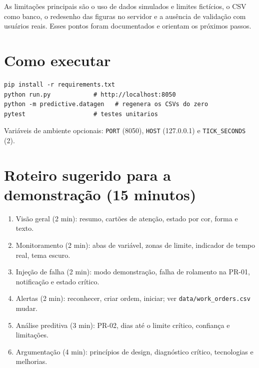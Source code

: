 \documentclass[12pt,a4paper]{article}
\newcommand{\codigo}[1]{\texttt{\small #1}}
\begin{document}
As limitações principais são o uso de dados simulados e limites fictícios, o CSV como banco, o redesenho das figuras no servidor e a ausência de validação com usuários reais.
Esses pontos foram documentados e orientam os próximos passos.

\appendix
\section{Como executar}
\begin{lstlisting}
pip install -r requirements.txt
python run.py            # http://localhost:8050
python -m predictive.datagen   # regenera os CSVs do zero
pytest                   # testes unitarios
\end{lstlisting}
Variáveis de ambiente opcionais: \codigo{PORT} (8050), \codigo{HOST} (127.0.0.1) e \codigo{TICK\_SECONDS} (2).

\section{Roteiro sugerido para a demonstração (15 minutos)}
\begin{enumerate}
  \item Visão geral (2 min): resumo, cartões de atenção, estado por cor, forma e texto.
  \item Monitoramento (2 min): abas de variável, zonas de limite, indicador de tempo real, tema escuro.
  \item Injeção de falha (2 min): modo demonstração, falha de rolamento na PR-01, notificação e estado crítico.
  \item Alertas (2 min): reconhecer, criar ordem, iniciar; ver \codigo{data/work\_orders.csv} mudar.
  \item Análise preditiva (3 min): PR-02, dias até o limite crítico, confiança e limitações.
  \item Argumentação (4 min): princípios de design, diagnóstico crítico, tecnologias e melhorias.
\end{enumerate}
\end{document}
